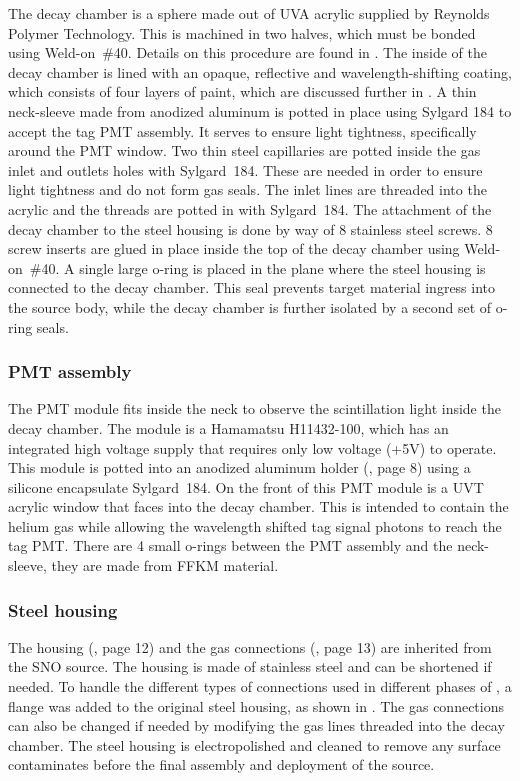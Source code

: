 The decay chamber is a sphere made out of UVA acrylic supplied by Reynolds Polymer Technology. 
This is machined in two halves, which must be bonded using Weld-on~\#40. Details on this procedure are found in .
The inside of the decay chamber is lined with an opaque, reflective and wavelength-shifting coating, which consists of four layers of paint, which are discussed further in .
A thin neck-sleeve made from anodized aluminum is potted in place using Sylgard 184 to accept the tag PMT assembly. 
It serves to ensure light tightness, specifically around the PMT window.
Two thin steel capillaries are potted inside the gas inlet and outlets holes with Sylgard~184. These are needed in order to ensure light tightness and do not form gas seals. The inlet lines are threaded into the acrylic and the threads are potted in with Sylgard~184. 
The attachment of the decay chamber to the steel housing is done by way of 8 stainless steel screws. 8 screw inserts are glued in place inside the top of the decay chamber using Weld-on~\#40.
A single large o-ring is placed in the plane where the steel housing is connected to the decay chamber. 
This seal prevents target material ingress into the source body, while the decay chamber is further isolated by a second set of o-ring seals.

\subsubsection{PMT assembly}

The PMT module fits inside the neck to observe the scintillation light inside the decay chamber. 
The module is a Hamamatsu H11432-100, which has an integrated high voltage supply that requires only low voltage (+5V) to operate. 
This module is potted into an anodized aluminum holder (\cite{wallig:2015}, page 8) using a silicone encapsulate Sylgard~184. 
On the front of this PMT module is a UVT acrylic window that faces into the decay chamber. This is intended to contain the helium gas while allowing the wavelength shifted tag signal photons to reach the tag PMT.
There are 4 small o-rings between the PMT assembly and the neck-sleeve, they are made from FFKM material.

\subsubsection{Steel housing}
The housing (\cite{wallig:2015}, page 12) and the gas connections (\cite{wallig:2015}, page 13) are inherited from the SNO \Li source. 
The housing is made of stainless steel and can be shortened if needed. 
To handle the different types of connections used in different phases of {\snop}, a flange was added to the original steel housing, as shown in . 
The gas connections can also be changed if needed by modifying the gas lines threaded into the decay chamber.
The steel housing is electropolished and cleaned to remove any surface contaminates before the final assembly and deployment of the source.

